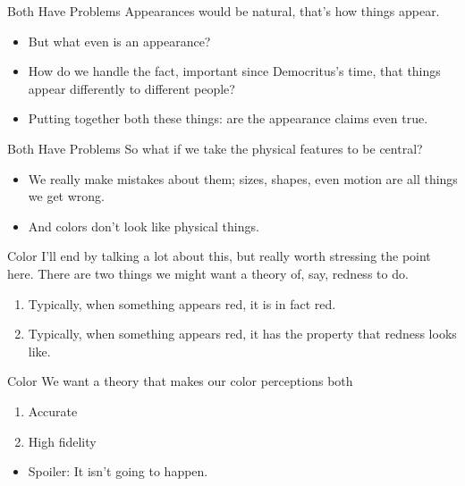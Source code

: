 \documentclass[
  17pt,
  letterpaper,
  ignorenonframetext,
  aspectratio=169,
]{beamer}
\providecommand{\tightlist}{%
  \setlength{\itemsep}{0pt}\setlength{\parskip}{0pt}}\usepackage{longtable,booktabs,array}
\begin{document}
\begin{frame}{Both Have Problems}
\protect\hypertarget{both-have-problems}{}
Appearances would be natural, that's how things appear.

\begin{itemize}[<+->]
\tightlist
\item
  But what even is an appearance?
\item
  How do we handle the fact, important since Democritus's time, that
  things appear differently to different people?
\item
  Putting together both these things: are the appearance claims even
  true.
\end{itemize}
\end{frame}

\begin{frame}{Both Have Problems}
\protect\hypertarget{both-have-problems-1}{}
So what if we take the physical features to be central?

\begin{itemize}[<+->]
\tightlist
\item
  We really make mistakes about them; sizes, shapes, even motion are all
  things we get wrong.
\item
  And colors don't look like physical things.
\end{itemize}
\end{frame}

\begin{frame}{Color}
\protect\hypertarget{color}{}
I'll end by talking a lot about this, but really worth stressing the
point here. There are two things we might want a theory of, say, redness
to do.

\begin{enumerate}[<+->]
\tightlist
\item
  Typically, when something appears red, it is in fact red.
\item
  Typically, when something appears red, it has the property that
  redness looks like.
\end{enumerate}
\end{frame}

\begin{frame}{Color}
\protect\hypertarget{color-1}{}
We want a theory that makes our color perceptions both

\begin{enumerate}[<+->]
\tightlist
\item
  Accurate
\item
  High fidelity
\end{enumerate}

\begin{itemize}[<+->]
\tightlist
\item
  Spoiler: It isn't going to happen.
\end{itemize}
\end{frame}
\end{document}
